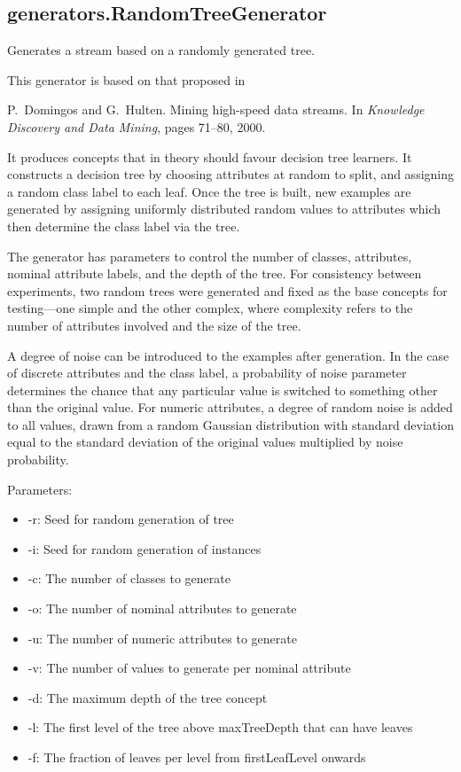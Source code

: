 \documentclass[a4paper,12pt,twoside]{book}
\begin{document}
\subsection{generators.RandomTreeGenerator} Generates a stream based on a randomly generated tree.

This generator is based on that proposed in
\begin{itemize}
P.~Domingos and G.~Hulten.
\newblock Mining high-speed data streams.
\newblock In {\em Knowledge Discovery and Data Mining}, pages 71--80, 2000.\end{itemize}

It produces concepts that in theory should favour decision tree learners. It 
constructs a decision tree by choosing attributes at random to split, and assigning
a random class label to each leaf. Once the tree is built, new examples are 
generated by assigning uniformly distributed random values to attributes which
then determine the class label via the tree.

    The generator has parameters to control the number of classes, attributes,
nominal attribute labels, and the depth of the tree. For consistency between
experiments, two random trees were generated and fixed as the base concepts
for testing—one simple and the other complex, where complexity refers to the
number of attributes involved and the size of the tree.
    

    A degree of noise can be introduced to the examples after generation. In the
case of discrete attributes and the class label, a probability of noise parameter
determines the chance that any particular value is switched to something other
than the original value. For numeric attributes, a degree of random noise is
added to all values, drawn from a random Gaussian distribution with standard
deviation equal to the standard deviation of the original values multiplied by
noise probability. 


Parameters:

\begin{itemize}
\item -r: Seed for random generation of tree
\item -i: Seed for random generation of instances
\item -c: The number of classes to generate
\item -o: The number of nominal attributes to generate
\item -u: The number of numeric attributes to generate
\item -v: The number of values to generate per nominal attribute
\item -d: The maximum depth of the tree concept
\item -l: The first level of the tree above maxTreeDepth that can have leaves
\item -f: The fraction of leaves per level from firstLeafLevel onwards\end{itemize}
\end{document}
